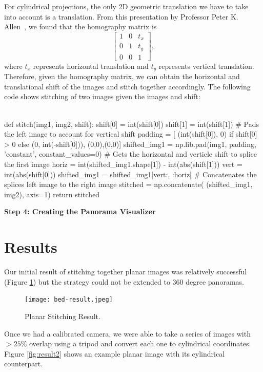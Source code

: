 \documentclass[10pt,twocolumn,letterpaper]{article}
\begin{document}
For cylindrical projections, the only 2D geometric translation we have to take into account is a translation. From this presentation by Professor Peter K. Allen~\cite{seitz}, we found that the homography matrix is 
\[
  \left[ {\begin{array}{ccc}
   1 & 0 & t_x\\
   0 & 1 & t_y\\
   0 & 0 & 1
  \end{array} } \right],
\]
where $t_x$ represents horizontal translation and $t_y$ represents vertical translation. Therefore, given the homography matrix, we can obtain the horizontal and translational shift of the images and stitch together accordingly. The following code shows stitching of two images given the images and shift:\\\\
\begin{python}
def stitch(img1, img2, shift):
    shift[0] = int(shift[0])
    shift[1] = int(shift[1])
    # Pads the left image to account for 
    vertical shift
    padding = [ (int(shift[0]), 0) 
        if shift[0] > 0 
        else (0, int(-shift[0])),
        (0,0),(0,0)]
    shifted_img1 = np.lib.pad(img1, padding, 
        'constant', constant_values=0)
    # Gets the horizontal and verticle shift 
    to splice the first image
    horiz = int(shifted_img1.shape[1]) - 
        int(abs(shift[1]))
    vert = int(abs(shift[0]))
    shifted_img1 = shifted_img1[vert:, :horiz]
    # Concatenates the splices left image 
    to the right image
    stitched = np.concatenate(
        (shifted_img1, img2), axis=1)
    return stitched
\end{python}

\bigskip
\noindent\textbf{Step 4: Creating the Panorama Visualizer}


\section{Results}

Our initial result of stitching together planar images was relatively successful (Figure \ref{fig:result1}) but the strategy could not be extended to 360 degree panoramas.

\begin{figure}[h]
    \centering
    \texttt{[image: bed-result.jpeg]}
    \caption{Planar Stitching Result.}
    \label{fig:result1}
\end{figure}

Once we had a calibrated camera, we were able to take a series of images with $>25\%$ overlap using a tripod and convert each one to cylindrical coordinates. Figure \ref{fig:result2} shows an example planar image with its cylindrical counterpart.\\
\end{document}
